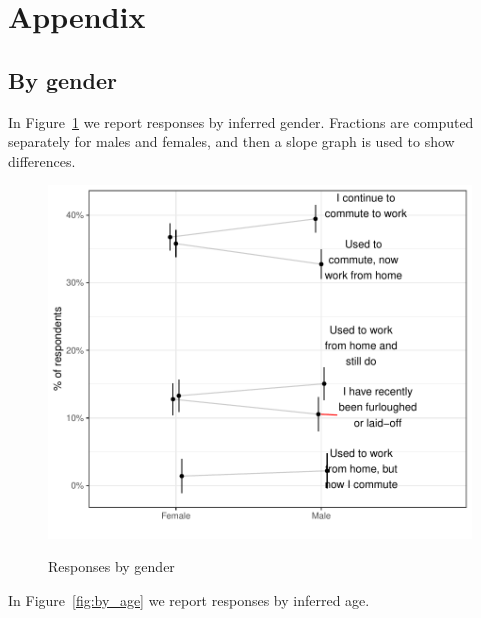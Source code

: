\documentclass[12pt]{article}
\begin{document}
\newpage \clearpage




\appendix

\section{Appendix} 
\subsection{By gender} \label{sec:gender}

In Figure~\ref{fig:gender} we report responses by inferred gender.
Fractions are computed separately for males and females, and then a slope graph is used to show differences. 

\begin{figure}
  \caption{Responses by gender} \label{fig:gender}
\centering
\begin{minipage}{1.0 \linewidth}
  \includegraphics[width = \linewidth]{plots/gender.pdf} \\
  \begin{footnotesize}
    \begin{singlespace}
    \end{singlespace}
    \end{footnotesize}
\end{minipage}
\end{figure} 


In Figure~\ref{fig:by_age} we report responses by inferred age. 
\end{document}
